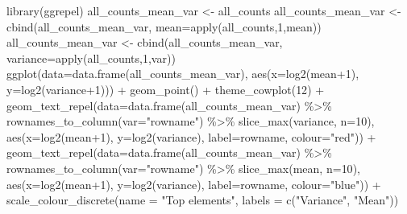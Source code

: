 \documentclass[
]{article}
\newenvironment{Shaded}{\begin{snugshade}}{\end{snugshade}}
\newcommand{\AttributeTok}[1]{\textcolor[rgb]{0.77,0.63,0.00}{#1}}
\newcommand{\DecValTok}[1]{\textcolor[rgb]{0.00,0.00,0.81}{#1}}
\newcommand{\FunctionTok}[1]{\textcolor[rgb]{0.00,0.00,0.00}{#1}}
\newcommand{\NormalTok}[1]{#1}
\newcommand{\OtherTok}[1]{\textcolor[rgb]{0.56,0.35,0.01}{#1}}
\newcommand{\SpecialCharTok}[1]{\textcolor[rgb]{0.00,0.00,0.00}{#1}}
\newcommand{\StringTok}[1]{\textcolor[rgb]{0.31,0.60,0.02}{#1}}
\begin{document}
\begin{Shaded}
\begin{Highlighting}[]
\FunctionTok{library}\NormalTok{(ggrepel)}
\NormalTok{all\_counts\_mean\_var }\OtherTok{\textless{}{-}}\NormalTok{ all\_counts}
\NormalTok{all\_counts\_mean\_var }\OtherTok{\textless{}{-}} \FunctionTok{cbind}\NormalTok{(all\_counts\_mean\_var, }\AttributeTok{mean=}\FunctionTok{apply}\NormalTok{(all\_counts,}\DecValTok{1}\NormalTok{,mean))}
\NormalTok{all\_counts\_mean\_var }\OtherTok{\textless{}{-}} \FunctionTok{cbind}\NormalTok{(all\_counts\_mean\_var, }\AttributeTok{variance=}\FunctionTok{apply}\NormalTok{(all\_counts,}\DecValTok{1}\NormalTok{,var))}
\FunctionTok{ggplot}\NormalTok{(}\AttributeTok{data=}\FunctionTok{data.frame}\NormalTok{(all\_counts\_mean\_var), }\FunctionTok{aes}\NormalTok{(}\AttributeTok{x=}\FunctionTok{log2}\NormalTok{(mean}\SpecialCharTok{+}\DecValTok{1}\NormalTok{), }\AttributeTok{y=}\FunctionTok{log2}\NormalTok{(variance}\SpecialCharTok{+}\DecValTok{1}\NormalTok{))) }\SpecialCharTok{+} \FunctionTok{geom\_point}\NormalTok{() }\SpecialCharTok{+} \FunctionTok{theme\_cowplot}\NormalTok{(}\DecValTok{12}\NormalTok{) }\SpecialCharTok{+} 
  \FunctionTok{geom\_text\_repel}\NormalTok{(}\AttributeTok{data=}\FunctionTok{data.frame}\NormalTok{(all\_counts\_mean\_var) }\SpecialCharTok{\%\textgreater{}\%} \FunctionTok{rownames\_to\_column}\NormalTok{(}\AttributeTok{var=}\StringTok{"rowname"}\NormalTok{) }\SpecialCharTok{\%\textgreater{}\%} \FunctionTok{slice\_max}\NormalTok{(variance, }\AttributeTok{n=}\DecValTok{10}\NormalTok{), }\FunctionTok{aes}\NormalTok{(}\AttributeTok{x=}\FunctionTok{log2}\NormalTok{(mean}\SpecialCharTok{+}\DecValTok{1}\NormalTok{), }\AttributeTok{y=}\FunctionTok{log2}\NormalTok{(variance), }\AttributeTok{label=}\NormalTok{rowname, }\AttributeTok{colour=}\StringTok{"red"}\NormalTok{)) }\SpecialCharTok{+}
  \FunctionTok{geom\_text\_repel}\NormalTok{(}\AttributeTok{data=}\FunctionTok{data.frame}\NormalTok{(all\_counts\_mean\_var) }\SpecialCharTok{\%\textgreater{}\%} \FunctionTok{rownames\_to\_column}\NormalTok{(}\AttributeTok{var=}\StringTok{"rowname"}\NormalTok{) }\SpecialCharTok{\%\textgreater{}\%} \FunctionTok{slice\_max}\NormalTok{(mean, }\AttributeTok{n=}\DecValTok{10}\NormalTok{), }\FunctionTok{aes}\NormalTok{(}\AttributeTok{x=}\FunctionTok{log2}\NormalTok{(mean}\SpecialCharTok{+}\DecValTok{1}\NormalTok{), }\AttributeTok{y=}\FunctionTok{log2}\NormalTok{(variance), }\AttributeTok{label=}\NormalTok{rowname, }\AttributeTok{colour=}\StringTok{"blue"}\NormalTok{)) }\SpecialCharTok{+} \FunctionTok{scale\_colour\_discrete}\NormalTok{(}\AttributeTok{name =} \StringTok{"Top elements"}\NormalTok{, }\AttributeTok{labels =} \FunctionTok{c}\NormalTok{(}\StringTok{"Variance"}\NormalTok{, }\StringTok{"Mean"}\NormalTok{))}
\end{Highlighting}
\end{Shaded}
\end{document}
